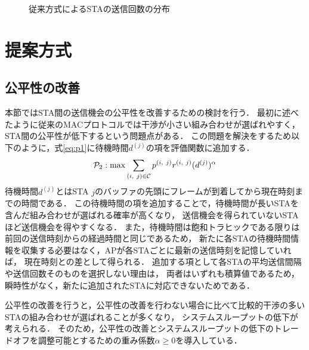 \documentclass[technicalreport]{ieicej}
\begin{document}
		\begin{figure}[t]
			\centering
			\caption{従来方式によるSTAの送信回数の分布}
			\label{fig:numtx}
		\end{figure}

\section{提案方式}
\subsection{公平性の改善}\label{sec:fair}
	本節ではSTA間の送信機会の公平性を改善するための検討を行う．
	最初に述べたように従来のMACプロトコルでは干渉が小さい組み合わせが選ばれやすく，
	STA間の公平性が低下するという問題点がある．
	この問題を解決をするため以下のように，式\eqref{eq:p1}に待機時間$d^{(j)}$の項を評価関数に追加する．
	\begin{equation}
		{\mathcal P}_2: {\rm max} \sum_{(i,\ j)\in{\mathcal C}} p^{(i,\ j)}r^{(i,\ j)}(d^{(j)})^{\alpha} \label{eq:p2}
	\end{equation}
	待機時間$d^{(j)}$とはSTA $j$のバッファの先頭にフレームが到着してから現在時刻までの時間である．
	この待機時間の項を追加することで，待機時間が長いSTAを含んだ組み合わせが選ばれる確率が高くなり，
	送信機会を得られていないSTAほど送信機会を得やすくなる．
	また，待機時間は飽和トラヒックである限りは前回の送信時刻からの経過時間と同じであるため，
	新たに各STAの待機時間情報を収集する必要はなく，APが各STAごとに最新の送信時刻を記憶していれば，
	現在時刻との差として得られる．
	追加する項として各STAの平均送信間隔や送信回数そのものを選択しない理由は，
	両者はいずれも積算値であるため，瞬時性がなく，新たに追加されたSTAに対応できないためである．
	\par
	公平性の改善を行うと，公平性の改善を行わない場合に比べて比較的干渉の多いSTAの組み合わせが選ばれることが多くなり，
	システムスループットの低下が考えられる．
	そのため，公平性の改善とシステムスループットの低下のトレードオフを調整可能とするための重み係数$\alpha\geq 0$を導入している．
\end{document}
